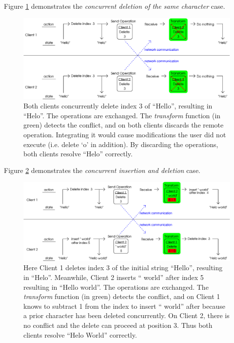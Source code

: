 \documentclass[12pt,a4paper,twoside,openright]{report}
\begin{document}
	Figure \ref{fig:ot2} demonstrates the \textit{concurrent deletion of the same character} case.

	\begin{figure}[H]
	\centering
	\includegraphics[width=1\linewidth]{figs/ot2.eps}
	\caption[Operational Transformations -- concurrent deletion]{Both clients concurrently delete index 3 of ``Hello'', resulting in ``Helo''. The operations are exchanged. The \textit{transform} function (in green) detects the conflict, and on both clients discards the remote operation. Integrating it would cause modifications the user did not execute (i.e. delete `o' in addition). By discarding the operations, both clients resolve ``Helo'' correctly.}
	\label{fig:ot2}
	\end{figure}
	
	Figure \ref{fig:ot3} demonstrates the \textit{concurrent insertion and deletion} case.
	

	\begin{figure}[H]
	\centering
	\includegraphics[width=1\linewidth]{figs/ot3.eps}
	\caption[Operational Transformations -- concurrent insertion and deletion]{Here Client 1 deletes index 3 of the initial string ``Hello'', resulting in ``Helo''. Meanwhile, Client 2 inserts `` world'' after index 5 resulting in ``Hello world''. The operations are exchanged. The \textit{transform} function (in green) detects the conflict, and on Client 1 knows to subtract 1 from the index to insert `` world'' after because a prior character has been deleted concurrently. On Client 2, there is no conflict and the delete can proceed at position 3. Thus both clients resolve ``Helo World'' correctly.}
	\label{fig:ot3}
	\end{figure}
\end{document}
